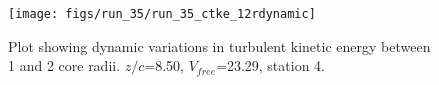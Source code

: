 \begin{figure}[H]
\centering
\texttt{[image: figs/run\_35/run\_35\_ctke\_12rdynamic]}
\caption{Plot showing dynamic variations in turbulent kinetic energy between 1 and 2 core radii. $z/c$=8.50, $V_{free}$=23.29, station 4.}
\label{fig:run_35_ctke_12rdynamic}
\end{figure}


